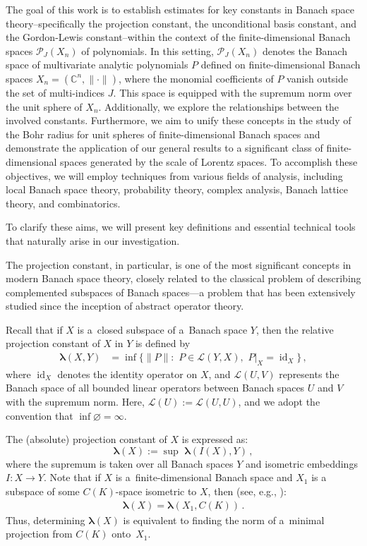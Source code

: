 \documentclass[12pt]{amsart}
\numberwithin{subsection}{section}
\theoremstyle{definition}
\theoremstyle{remark}
\DeclareMathOperator{\id}{\mathrm{id}}
\begin{document}
The goal of this work is to establish estimates for key constants in Banach space theory--specifically the projection constant, the unconditional basis constant, and the Gordon-Lewis constant--within the context of the finite-dimensional Banach spaces $\mathcal{P}_J(X_n)$ of polynomials. In this setting, $\mathcal{P}_J(X_n)$
denotes the Banach space of multivariate analytic polynomials $P$ defined on finite-dimensional Banach spaces $X_n = (\mathbb{C}^n, \|\cdot\|)$, where the monomial coefficients of $P$ vanish outside the set of multi-indices $J$. This space is equipped with the supremum norm over the unit sphere of $X_n$.  Additionally, we explore the relationships between the involved constants. Furthermore, we aim to unify these concepts in the study
of the Bohr radius for unit spheres of finite-dimensional Banach spaces and demonstrate the application of our general results to a significant class of finite-dimensional spaces generated by the scale of Lorentz spaces. To accomplish these objectives, we will employ techniques from various fields of analysis, including local Banach space theory, probability theory, complex analysis, Banach lattice theory, and combinatorics.

To clarify these aims, we will present key definitions and essential technical tools that naturally arise in our investigation.


The projection constant, in particular, is one of the most significant concepts in modern Banach space theory, closely related to the classical problem of describing complemented subspaces of Banach spaces—a problem that has been extensively studied since the inception of abstract operator theory.

Recall that if $X$ is a~closed subspace of a~Banach space $Y$, then the relative projection constant of $X$ in $Y$ is defined by
\begin{align*}
\boldsymbol{\lambda}(X, Y) & =  \inf\big\{\|P\|: \,\, P\in \mathcal{L}(Y, X),\,\, P|_{X} = \id_X\big\}\,,
\end{align*}
where $\id_X$ denotes the identity operator on $X$, and $\mathcal{L}(U,V)$ represents the Banach space of all bounded linear
operators between Banach spaces $U$ and $V$ with the supremum norm. Here, $\mathcal{L}(U):=\mathcal{L}(U,U)$, and we adopt the
convention that $\inf \varnothing = \infty$.

The (absolute) projection constant of $X$ is expressed as:
\[
\boldsymbol{\lambda}(X) := \sup \,\,\boldsymbol{\lambda}(I(X),Y)\,,
\]
where the supremum is taken over all Banach spaces $Y$ and isometric embeddings $I\colon X \to Y$. Note that if $X$ is
a~finite-dimensional Banach space and $X_1$ is a subspace of some $C(K)$-space isometric to $X$, then (see, e.g., \cite[III.B.5 Theorem] {wojtaszczyk1996banach}):
\begin{align*}
\boldsymbol{\lambda}(X) = \boldsymbol{\lambda}(X_1, C(K))\,.
\end{align*}
Thus, determining $\boldsymbol{\lambda}(X)$ is equivalent to finding the norm of a~minimal projection from $C(K)$ onto~$X_1$.
\end{document}
